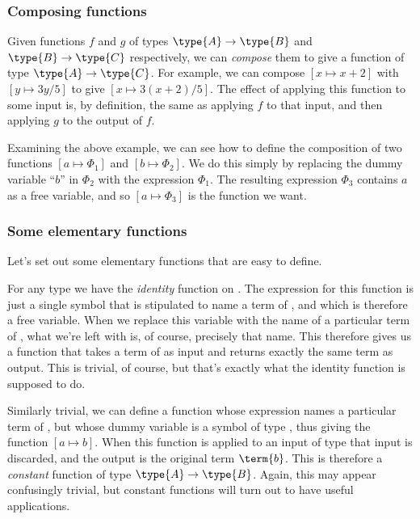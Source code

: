\subsubsection{Composing functions}

Given functions $f$ and $g$ of types $\type{A} \to \type{B}$ and $\type{B} \to \type{C}$ respectively, we can \emph{compose} them to give a function of type $\type{A} \to \type{C}$.  
For example, we can compose $[x \mapsto x + 2]$ with $[y \mapsto 3y/5]$ to give $[x \mapsto 3(x+2)/5]$.  The effect of applying this function to some input is, by definition, the same as applying $f$ to that input, and then applying $g$ to the output of $f$.

Examining the above example, we can see how to define the composition of two functions $[a \mapsto \Phi_1]$ and $[b \mapsto \Phi_2]$.  We do this
simply by replacing the dummy variable ``$b$'' in $\Phi_2$ with the expression $\Phi_1$.  The resulting expression $\Phi_3$ 
contains $a$ as a free variable, and so $[a \mapsto \Phi_3]$ is the function we want.


\subsubsection{Some elementary functions}

Let's set out some elementary functions that are easy to define.

For any type  we have the \emph{identity} function on .  The expression for this function is just a single symbol 
that is stipulated to name a term of , and which is therefore a free variable.  When we replace this variable with the name of a particular term of , what we're left with is, of course, precisely that name.  This therefore gives us a function that takes a term of  as input and returns exactly the same term as output.  This is trivial, of course, but that's exactly what the identity function is supposed to do.

Similarly trivial, we can define a function whose expression names a particular term  of , but whose dummy variable is a symbol  of type , thus giving the function $[a \mapsto b]$.  When this function is applied to an input of type  that input is discarded, and the output is the original term $\term{b}$.  This is therefore a \emph{constant} function of type $\type{A} \to \type{B}$.  Again, this may appear confusingly trivial, but constant functions will turn out to have useful applications.






